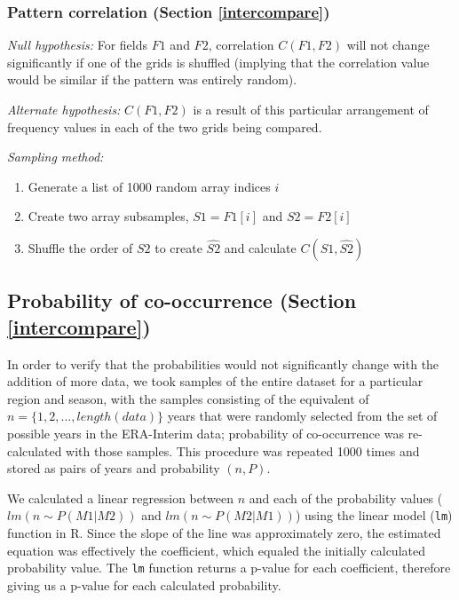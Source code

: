 \documentclass[smallextended]{svjour3}       %
\numberwithin{equation}{section}
\begin{document}
\begin{appendices}
\subsubsection{Pattern correlation (Section \ref{intercompare})}
\textit{Null hypothesis:} For fields $F1$ and $F2$, correlation $C(F1,F2)$ will not change significantly if one of the grids is shuffled (implying that the correlation value would be similar if the pattern was entirely random).

\noindent\textit{Alternate hypothesis:} $C(F1,F2)$ is a result of this particular arrangement of frequency values in each of the two grids being compared.

\noindent\textit{Sampling method:}\begin{enumerate}
    \item Generate a list of 1000 random array indices $i$
        \item Create two array subsamples, $S1=F1[i]$ and $S2=F2[i]$
        \item Shuffle the order of $S2$ to create $\widehat{S2}$ and calculate $C(S1,\widehat{S2})$
\end{enumerate}


        
\subsection{Probability of co-occurrence (Section \ref{intercompare})}

In order to verify that the probabilities would not significantly change with the addition of more data, we took samples of the entire dataset for a particular region and season, with the samples consisting of the equivalent of $n=\{1,2,...,length(data)\}$ years that were randomly selected from the set of possible years in the ERA-Interim data; probability of co-occurrence was re-calculated with those samples. This procedure was repeated 1000 times and stored as pairs of years and probability $(n,P)$.

We calculated a linear regression between $n$ and each of the probability values ($lm(n\sim P(M1|M2))$ and $lm(n\sim P(M2|M1))$) using the linear model (\texttt{lm}) function in R. Since the slope of the line was approximately zero, the estimated equation was effectively the coefficient, which equaled the initially calculated probability value. The \texttt{lm} function returns a p-value for each coefficient, therefore giving us a p-value for each calculated probability.


\end{appendices}
\end{document}
